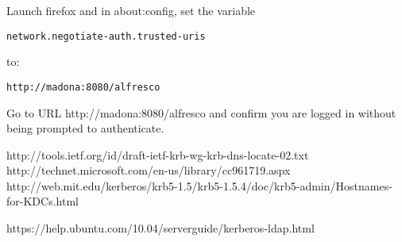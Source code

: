 \documentclass[12pt,a4]{article}
\begin{document}
Launch firefox and in about:config, set the variable

\begin{verbatim}
network.negotiate-auth.trusted-uris
\end{verbatim}
to:
\begin{verbatim}
http://madona:8080/alfresco
\end{verbatim}


Go to URL http://madona:8080/alfresco and confirm you are logged in without being prompted to authenticate.



\begin{thebibliography}{9}

http://tools.ietf.org/id/draft-ietf-krb-wg-krb-dns-locate-02.txt
http://technet.microsoft.com/en-us/library/cc961719.aspx
http://web.mit.edu/kerberos/krb5-1.5/krb5-1.5.4/doc/krb5-admin/Hostnames-for-KDCs.html

https://help.ubuntu.com/10.04/serverguide/kerberos-ldap.html

 \end{thebibliography}
\end{document}
